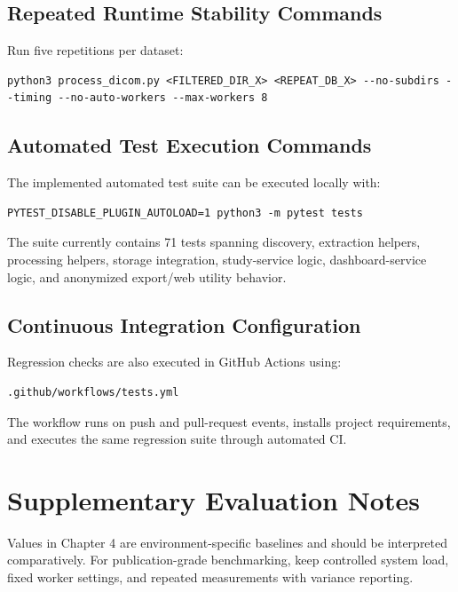 \section{Repeated Runtime Stability Commands}
Run five repetitions per dataset:
\begin{lstlisting}[breaklines=true,basicstyle=\ttfamily\small]
python3 process_dicom.py <FILTERED_DIR_X> <REPEAT_DB_X> --no-subdirs --timing --no-auto-workers --max-workers 8
\end{lstlisting}

\section{Automated Test Execution Commands}
The implemented automated test suite can be executed locally with:
\begin{lstlisting}[breaklines=true,basicstyle=\ttfamily\small]
PYTEST_DISABLE_PLUGIN_AUTOLOAD=1 python3 -m pytest tests
\end{lstlisting}

The suite currently contains 71 tests spanning discovery, extraction helpers, processing helpers, storage integration, study-service logic, dashboard-service logic, and anonymized export/web utility behavior.

\section{Continuous Integration Configuration}
Regression checks are also executed in GitHub Actions using:
\begin{lstlisting}[breaklines=true,basicstyle=\ttfamily\small]
.github/workflows/tests.yml
\end{lstlisting}

The workflow runs on push and pull-request events, installs project requirements, and executes the same regression suite through automated CI.

\chapter{Supplementary Evaluation Notes}
Values in Chapter 4 are environment-specific baselines and should be interpreted comparatively. For publication-grade benchmarking, keep controlled system load, fixed worker settings, and repeated measurements with variance reporting.

